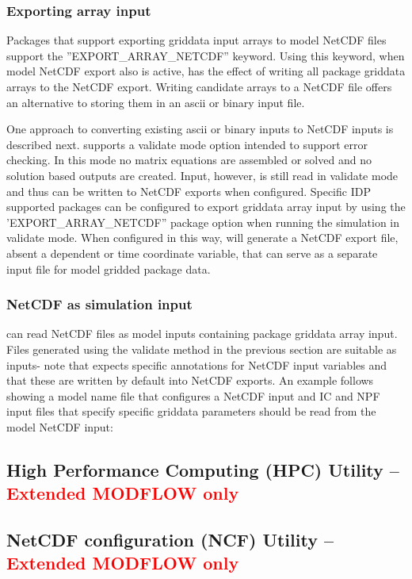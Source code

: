 \subsubsection{Exporting array input}
Packages that support exporting griddata input arrays to model NetCDF files support the ''EXPORT\_ARRAY\_NETCDF'' keyword.  Using this keyword, when model NetCDF export also is active, has the effect of writing all package griddata arrays to the NetCDF export.  Writing candidate arrays to a NetCDF file offers an alternative to storing them in an ascii or binary input file.

One approach to converting existing ascii or binary inputs to NetCDF inputs is described next.  \mf supports a validate mode option intended to support error checking.  In this mode no matrix equations are assembled or solved and no solution based outputs are created.  Input, however, is still read in validate mode and thus can be written to NetCDF exports when configured. Specific IDP supported packages can be configured to export griddata array input by using the 'EXPORT\_ARRAY\_NETCDF'' package option when running the simulation in validate mode.  When configured in this way, \mf will generate a NetCDF export file, absent a dependent or time coordinate variable, that can serve as a separate input file for model gridded package data.

\subsubsection{NetCDF as simulation input}
\mf can read NetCDF files as model inputs containing package griddata array input. Files generated using the validate method in the previous section are suitable as inputs- note that \mf expects specific annotations for NetCDF input variables and that these are written by default into \mf NetCDF exports. An example follows showing a model name file that configures a NetCDF input and IC and NPF input files that specify specific griddata parameters should be read from the model NetCDF input:


\subsection{High Performance Computing (HPC) Utility -- \textcolor{red}{Extended MODFLOW only}}


\subsection{NetCDF configuration (NCF) Utility -- \textcolor{red}{Extended MODFLOW only}}

